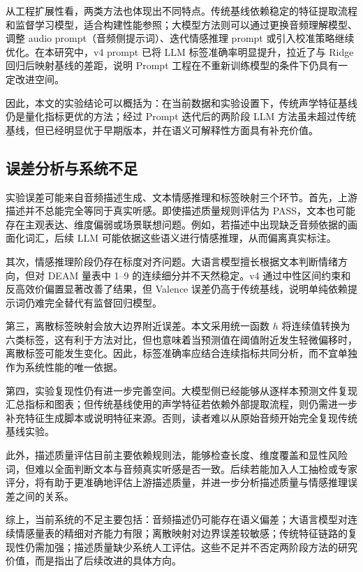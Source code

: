 从工程扩展性看，两类方法也体现出不同特点。传统基线依赖稳定的特征提取流程和监督学习模型，适合构建性能参照；大模型方法则可以通过更换音频理解模型、调整 audio prompt（音频侧提示词）、迭代情感推理 prompt 或引入校准策略继续优化。在本研究中，v4 prompt 已将 LLM 标签准确率明显提升，拉近了与 Ridge 回归后映射基线的差距，说明 Prompt 工程在不重新训练模型的条件下仍具有一定改进空间。

因此，本文的实验结论可以概括为：在当前数据和实验设置下，传统声学特征基线仍是量化指标更优的方法；经过 Prompt 迭代后的两阶段 LLM 方法虽未超过传统基线，但已经明显优于早期版本，并在语义可解释性方面具有补充价值。

\subsection{误差分析与系统不足}

实验误差可能来自音频描述生成、文本情感推理和标签映射三个环节。首先，上游描述并不总能完全等同于真实听感。即使描述质量规则评估为 PASS，文本也可能存在主观表达、维度偏弱或场景联想问题。例如，若描述中出现缺乏音频依据的画面化词汇，后续 LLM 可能依据这些语义进行情感推理，从而偏离真实标注。

其次，情感推理阶段仍存在标度对齐问题。大语言模型擅长根据文本判断情绪方向，但对 DEAM 量表中 1--9 的连续细分并不天然稳定。v4 通过中性区间约束和反高效价偏置显著改善了结果，但 Valence 误差仍高于传统基线，说明单纯依赖提示词仍难完全替代有监督回归模型。

第三，离散标签映射会放大边界附近误差。本文采用统一函数 $h$ 将连续值转换为六类标签，这有利于方法对比，但也意味着当预测值在阈值附近发生轻微偏移时，离散标签可能发生变化。因此，标签准确率应结合连续指标共同分析，而不宜单独作为系统性能的唯一依据。

第四，实验复现性仍有进一步完善空间。大模型侧已经能够从逐样本预测文件复现汇总指标和图表；但传统基线使用的声学特征若依赖外部提取流程，则仍需进一步补充特征生成脚本或说明特征来源。否则，读者难以从原始音频开始完全复现传统基线实验。

此外，描述质量评估目前主要依赖规则法，能够检查长度、维度覆盖和显性风险词，但难以全面判断文本与音频真实听感是否一致。后续若能加入人工抽检或专家评分，将有助于更准确地评估上游描述质量，并进一步分析描述质量与情感推理误差之间的关系。

综上，当前系统的不足主要包括：音频描述仍可能存在语义偏差；大语言模型对连续情感量表的精细对齐能力有限；离散映射对边界误差较敏感；传统特征链路的复现性仍需加强；描述质量缺少系统人工评估。这些不足并不否定两阶段方法的研究价值，而是指出了后续改进的具体方向。


